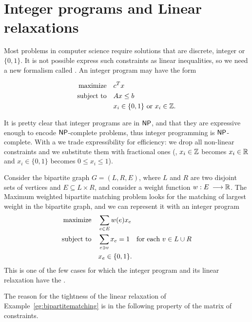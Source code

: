 \documentclass[a4paper,twoside,justified]{tufte-handout}
\begin{document}
\section{Integer programs and Linear relaxations}

Most problems in computer science require solutions that are discrete,
integer or $ \{0,1\} $. It is not possible express such constraints as
linear inequalities, so we need a new formalism called
. An integer program may have the
form

\begin{alignat*}{2}
  \text{maximize}\hspace{1em}&  c^{T}x\\
  \text{subject to}\hspace{1em}& Ax \leq b\\
  & x_{i}\in\{0,1\}\text{\ or\ }x_{i}\in\mathbb{Z}.
\end{alignat*}

It is pretty clear that integer programs are in $ \mathsf{NP} $, and that they
are expressive enough to encode $\mathsf{NP}$-complete problems, thus integer
programming is $\mathsf{NP}$-complete.
%
With a  we trade expressibility
for efficiency: we drop all non-linear
constraints and we substitute them with fractional ones (\eg, $
x_{i}\in \mathbb{Z} $ becomes $ x_{i}\in\mathbb{R} $ and $ x_{i} \in\{0,1\} $
becomes $ 0\leq x_{i}\leq 1 $).

\begin{example}%
  \label{eg:bipartitematching}
  Consider the bipartite graph $G=(L,R,E)$, where $L$ and $R$ are two
  disjoint sets of vertices and $ E\subseteq L\times R $, and consider
  a weight function $w:E\:\longrightarrow \mathbb{R} $.  The Maximum
  weighted bipartite matching problem looks for the matching of
  largest weight in the bipartite graph, and we can represent it with
  an integer program
  \begin{alignat*}{3}
    \text{maximize}\hspace{1em}& \sum_{e\in E} w(e) x_{e}\\
    \text{subject to}\hspace{1em}& \sum_{e \ni v} x_{e} =1 \quad \text{for each $v\in L\cup R$}\\
    & x_{e} \in\{0,1\}.
  \end{alignat*}
  This is one of the few cases for which the integer program and its linear
  relaxation have the .
\end{example}

The reason for the tightness of the linear relaxation of
Example~\ref{eg:bipartitematching} is in the following property of the
matrix of constraints.
\end{document}

